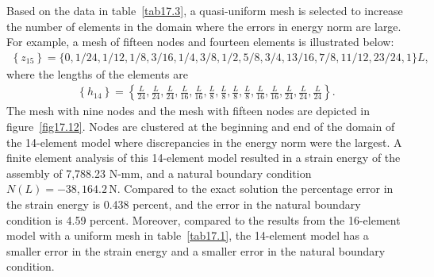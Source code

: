 \documentclass{AeroStructure-ERJohnson}
\begin{document}
\begin{table}[h]%
\end{table}

Based on the data in table~\ref{tab17.3}, a quasi-uniform mesh is selected to increase the number of elements in the domain where the errors in energy norm are large. For example, a mesh of fifteen nodes and fourteen elements is illustrated below:
\begin{align}\label{eq17.49}
\left\{z_{15}\right\}=\{0,1/24,1/12,1/8,3/16,1/4,3/8,1/2,5/8,3/4,13/16,7/8,11/12,23/24,1\} L,
\end{align}
where the lengths of the elements are
\begin{align}\label{eq17.50}
\left\{h_{14}\right\}=\left\{\frac{L}{24}, \frac{L}{24}, \frac{L}{24}, \frac{L}{16}, \frac{L}{16}, \frac{L}{8}, \frac{L}{8}, \frac{L}{8}, \frac{L}{8}, \frac{L}{16}, \frac{L}{16}, \frac{L}{24}, \frac{L}{24}, \frac{L}{24}\right\}.
\end{align}
The mesh with nine nodes and the mesh with fifteen nodes are depicted in figure~\ref{fig17.12}. Nodes are clustered at the beginning and end of the domain of the 14-element model where discrepancies in the energy norm were the largest. A finite element analysis of this 14-element model resulted in a strain energy of the assembly of 7,788.23 N-mm, and a natural boundary condition $N(L)=-38{,}164.2\,\mathrm{N}$. Compared to the exact solution the percentage error in the strain energy is 0.438 percent, and the error in the natural boundary condition is 4.59 percent. Moreover, compared to the results from the 16-element model with a uniform mesh in table~\ref{tab17.1}, the 14-element model has a smaller error in the strain energy and a smaller error in the natural boundary condition.
\end{document}
